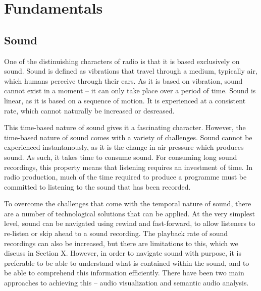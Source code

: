 \section{Fundamentals}



\subsection{Sound}
One of the distinuishing characters of radio is that it is based exclusively on sound.
Sound is defined as vibrations that travel through a medium, typically air, which humans perceive through their ears.
As it is based on vibration, sound cannot exist in a moment -- it can only take place over a period of time.
Sound is linear, as it is based on a sequence of motion.
It is experienced at a consistent rate, which cannot naturally be increased or desreased.

This time-based nature of sound gives it a fascinating character.
However, the time-based nature of sound comes with a variety of challenges.
Sound cannot be experienced instantanously, as it is the change in air pressure which produces sound.
As such, it takes time to consume sound.
For consuming long sound recordings, this property means that listening requires an investment of time.
In radio production, much of the time required to produce a programme must be committed to listening to the sound that has been recorded.

To overcome the challenges that come with the temporal nature of sound, there are a number of technological solutions
that can be applied. At the very simplest level, sound can be navigated using rewind and fast-forward, to allow
listeners to re-listen or skip ahead to a sound recording. The playback rate of sound recordings can also be increased,
but there are limitations to this, which we discuss in Section X. However, in order to navigate sound with purpose, it
is preferable to be able to understand what is contained within the sound, and to be able to comprehend this
information efficiently. There have been two main approaches to achieving this -- audio visualization and semantic
audio analysis.

